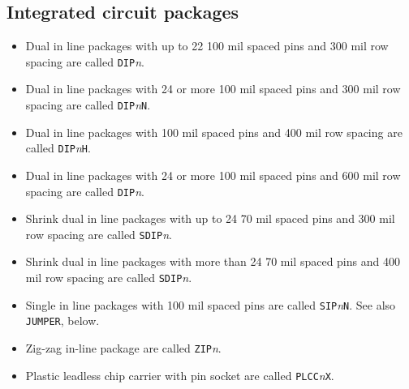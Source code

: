 \documentclass{article}
\begin{document}
\subsection{Integrated circuit packages}
\begin{itemize}
\item   Dual in line packages with up to 22 100 mil spaced pins and 300
	mil row spacing are called {\tt DIP}{\it n}.

\item   Dual in line packages with 24 or more 100 mil spaced pins and
	300 mil row spacing are called {\tt DIP}{\it n}{\tt N}.

\item   Dual in line packages with 100 mil spaced pins and 400 mil row
	spacing are called {\tt DIP}{\it n}{\tt H}.

\item   Dual in line packages with 24 or more 100 mil spaced pins and
	600 mil row spacing are called {\tt DIP}{\it n}.

\item   Shrink dual in line packages with up to 24 70 mil spaced pins
	and 300 mil row spacing are called {\tt SDIP}{\it n}.

\item   Shrink dual in line packages with more than 24 70 mil spaced
	pins and 400 mil row spacing are called {\tt SDIP}{\it n}.

\item   Single in line packages with 100 mil spaced pins are called
	{\tt SIP}{\it n}{\tt N}. See also {\tt JUMPER}, below.

\item   Zig-zag in-line package are called {\tt ZIP}{\it n}.

\item   Plastic leadless chip carrier with pin socket are called
	{\tt PLCC}{\it n}{\tt X}.
\end{itemize}
\end{document}

